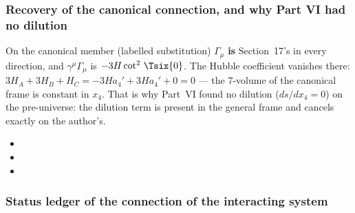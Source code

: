 \subsubsection{Recovery of the canonical connection, and why Part VI had no dilution}
\label{sec:4.4.8}

On the canonical member (labelled substitution) $\Gamma_\mu$ \textbf{is} Section~17's
 in every direction, and $\gamma^\mu\Gamma_\mu$ is $-3H\cot^2\,\Tsix{0}$. The
Hubble coefficient vanishes there: $3H_A+3H_B+H_C=-3Ha_4'+3Ha_4'+0=0$ --- the 7-volume of the canonical
frame is constant in $x_4$. That is why Part~VI found no dilution ($ds/dx_4=0$) on the pre-universe: the
dilution term is present in the general frame and cancels exactly on the author's. 
\begin{itemize}
  \item {}
  \item {}
  \item {}
\end{itemize}

\subsubsection{Status ledger of the connection of the interacting system}
\label{sec:4.4.9}

